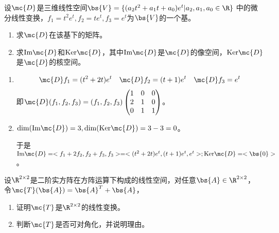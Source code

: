 \documentclass[12pt, a4paper, oneside, UTF8]{ctexbook}
\begin{document}
\begin{question}

    设$\mc{D}$是三维线性空间$\bs{V}=\{(a_2t^2+a_1t+a_0)e^t|a_2,a_1,a_0 \in \R\}$
    中的微分线性变换，$f_1=t^2e^t,f_2=te^t,f_3=e^t$为$\bs{V}$的一个基。
    \begin{enumerate}[label=(\arabic{*})]
        \item 求$\mc{D}$在该基下的矩阵。
        \item 求$\mathrm{Im}\mc{D}$和$\mathrm{Ker}\mc{D}$，其中$\mathrm{Im}\mc{D}$是$\mc{D}$的像空间，$\mathrm{Ker}\mc{D}$是$\mc{D}$的核空间。
    \end{enumerate}
\end{question}

\begin{solution}
    \begin{enumerate}[label=(\arabic{*})]
        \item \begin{align*}
            \mc{D}f_1=(t^2+2t)e^t \quad
            \mc{D}f_2=(t+1)e^t \quad
            \mc{D}f_3=e^t
        \end{align*}
        即$\mc{D}(f_1,f_2,f_3)=(f_1,f_2,f_3)\begin{pmatrix}
            1& 0&0 \\
            2& 1&0 \\
            0& 1&1
        \end{pmatrix}$。
        \item $\mathrm{dim}(\mathrm{Im}\mc{D})=3,\mathrm{dim}(\mathrm{Ker}\mc{D})=3-3=0$。
        
        于是$\mathrm{Im}\mc{D}=<f_1+2f_2,f_2+f_3,f_3>=<(t^2+2t)e^t,(t+1)e^t,e^t>;\mathrm{Ker}\mc{D}=<\bs{0}>$。
    \end{enumerate}
\end{solution}

\begin{question}
    设$\R^{2\times 2}$是二阶实方阵在方阵运算下构成的线性空间，对任意$\bs{A}\in \R^{2\times 2}$，
    令$\mc{T}(\bs{A})=\bs{A}^T+\bs{A}$，
    \begin{enumerate}[label=(\arabic{*})]
        \item 证明$\mc{T}$是$\R^{2\times 2}$的线性变换。
        \item 判断$\mc{T}$是否可对角化，并说明理由。
    \end{enumerate}
\end{question}
\end{document}
